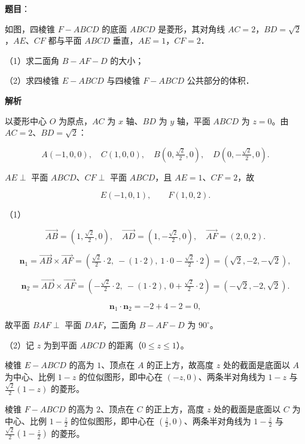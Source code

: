 \begin{answer}

\textbf{题目}：

如图，四棱锥 $F-ABCD$ 的底面 $ABCD$ 是菱形，其对角线 $AC=2$，$BD=\sqrt2$，$AE$、$CF$ 都与平面 $ABCD$ 垂直，$AE=1$，$CF=2$．

（1）求二面角 $B-AF-D$ 的大小；

（2）求四棱锥 $E-ABCD$ 与四棱锥 $F-ABCD$ 公共部分的体积．
\nopagebreak[4]
\begin{center}\end{center}
\nopagebreak[4]
\textbf{解析}

以菱形中心 $O$ 为原点，$AC$ 为 $x$ 轴、$BD$ 为 $y$ 轴，平面 $ABCD$ 为 $z=0$。由 $AC=2$、$BD=\sqrt2$：

\nopagebreak[4]
\[A(-1,0,0),\quad C(1,0,0),\quad
B\left(0,\tfrac{\sqrt2}{2},0\right),\quad D\left(0,-\tfrac{\sqrt2}{2},0\right).\]

$AE\perp$ 平面 $ABCD$、$CF\perp$ 平面 $ABCD$，且 $AE=1$、$CF=2$，故

\nopagebreak[4]
\[E(-1,0,1),\qquad F(1,0,2).\]

（1）

\nopagebreak[4]
\[\overrightarrow{AB}=\left(1,\tfrac{\sqrt2}{2},0\right),\quad
\overrightarrow{AD}=\left(1,-\tfrac{\sqrt2}{2},0\right),\quad
\overrightarrow{AF}=(2,0,2).\]

\nopagebreak[4]
\[\boldsymbol n_1=\overrightarrow{AB}\times\overrightarrow{AF}
=\left(\tfrac{\sqrt2}{2}\cdot2,\ -(1\cdot2),\ 1\cdot0-\tfrac{\sqrt2}{2}\cdot2\right)
=(\sqrt2,-2,-\sqrt2),\]

\nopagebreak[4]
\[\boldsymbol n_2=\overrightarrow{AD}\times\overrightarrow{AF}
=\left(-\tfrac{\sqrt2}{2}\cdot2,\ -(1\cdot2),\ 0+\tfrac{\sqrt2}{2}\cdot2\right)
=(-\sqrt2,-2,\sqrt2).\]

\nopagebreak[4]
\[\boldsymbol n_1\cdot\boldsymbol n_2=-2+4-2=0,\]

故平面 $BAF\perp$ 平面 $DAF$，二面角 $B-AF-D$ 为 $90^\circ$。

（2）记 $z$ 为到平面 $ABCD$ 的距离（$0\leqslant z\leqslant1$）。

棱锥 $E-ABCD$ 的高为 $1$、顶点在 $A$ 的正上方，故高度 $z$ 处的截面是底面以 $A$ 为中心、比例 $1-z$ 的位似图形，即中心在 $(-z,0)$、两条半对角线为 $1-z$ 与 $\frac{\sqrt2}{2}(1-z)$ 的菱形。

棱锥 $F-ABCD$ 的高为 $2$、顶点在 $C$ 的正上方，高度 $z$ 处的截面是底面以 $C$ 为中心、比例 $1-\frac z2$ 的位似图形，即中心在 $\left(\frac z2,0\right)$、两条半对角线为 $1-\frac z2$ 与 $\frac{\sqrt2}{2}\left(1-\frac z2\right)$ 的菱形。


\end{answer}
